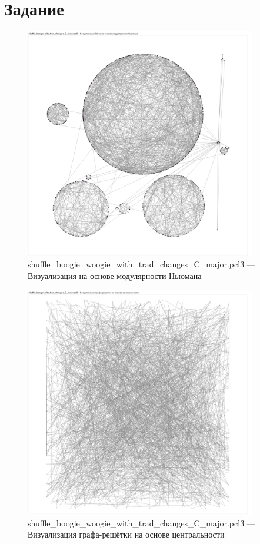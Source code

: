 \documentclass[a4paper,oneside,14pt]{extarticle}
\begin{document}

\setcounter{page}{2}
\renewcommand{\contentsname}{СОДЕРЖАНИЕ}
\tableofcontents

\newpage

\section{Задание}

\begin{figure}[H]
	\centering
	\includegraphics[width=0.9\textwidth]{img/boogiewoogie-newmann.pdf}
	\caption{shuffle\_boogie\_woogie\_with\_trad\_changes\_C\_major.pcl3 --- Визуализация на основе модулярности Ньюмана}
	\label{fig:}
\end{figure}

\begin{figure}[H]
	\centering
	\includegraphics[width=0.9\textwidth]{img/boogiewoogie-lattice.pdf}
    \caption{shuffle\_boogie\_woogie\_with\_trad\_changes\_C\_major.pcl3 --- Визуализация графа-решётки на основе центральности}
	\label{fig:}
\end{figure}
\end{document}
